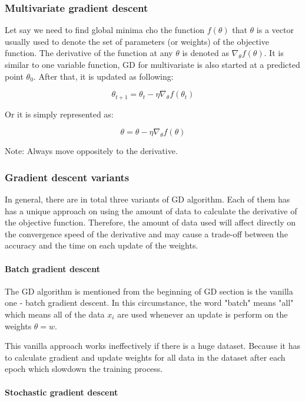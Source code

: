	\subsubsection{Multivariate gradient descent}
	\noindent
	
	Let say we need to find global minima cho the function $f(\theta)$ that $\theta$ is a vector usually used to denote the set of parameters (or weights) of the objective function. The derivative of the function at any $\theta$ is denoted as $\nabla_{\theta}f(\theta)$. It is similar to one variable function, GD for multivariate is also started at a predicted point $\theta_0$. After that, it is updated as following:
	
	\[\theta_{t+1} = \theta_t - \eta\nabla_{\theta}f(\theta_t) \]
	
	\noindent	
	Or it is simply represented as:
	
	\[\theta = \theta - \eta\nabla_{\theta}f(\theta) \]
	
	\noindent
	Note: Always move oppositely to the derivative.
	
	\subsubsection{Gradient descent variants}
	\noindent
	
	In general, there are in total three variants of GD algorithm. Each of them has has a unique approach on using the amount of data to calculate the derivative of the objective function. Therefore, the amount of data used will affect directly on the convergence speed of the derivative and may cause a trade-off between the accuracy and the time on each update of the weights.
	
	
	\paragraph{Batch gradient descent}
	\noindent

	The GD algorithm is mentioned from the beginning of GD section is the vanilla one - batch gradient descent. In this circumstance, the word "batch" means "all" which means all of the data $x_i$ are used whenever an update is perform on the weights $\theta = w$.
	
	This vanilla approach works ineffectively if there is a huge dataset. Because it has to calculate gradient and update weights for all data in the dataset after each epoch which slowdown the training process.
	
	\paragraph{Stochastic gradient descent}
	\noindent

